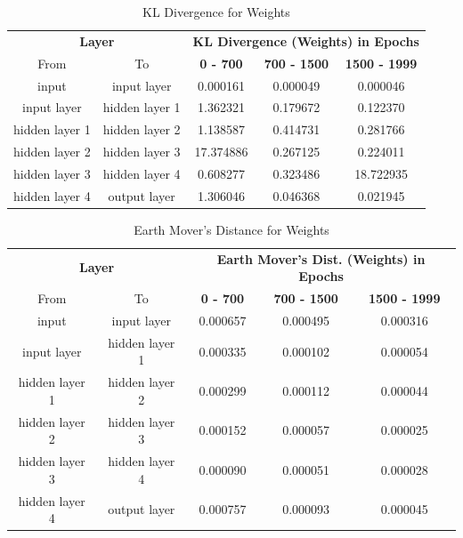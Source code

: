 \documentclass{ioereport}
\begin{document}
    \begin{table}[H]
    \caption{KL Divergence for Weights}
    \centering
    \begin{tabular}{|c|c|c|c|c|}
    \hline
    \multicolumn{2}{|c|}{\textbf{Layer}} & \multicolumn{3}{c|}{\textbf{KL Divergence (Weights) in Epochs}} \\
    \cline{1-5}
    From & To & \textbf{0 - 700} & \textbf{700 - 1500} & \textbf{1500 - 1999} \\
    \hline
    input & input layer & 0.000161 & 0.000049 & 0.000046 \\
    input layer & hidden layer 1 & 1.362321 & 0.179672 & 0.122370 \\
    hidden layer 1 & hidden layer 2 & 1.138587 & 0.414731 & 0.281766 \\
    hidden layer 2 & hidden layer 3 & 17.374886 & 0.267125 & 0.224011 \\
    hidden layer 3 & hidden layer 4 & 0.608277 & 0.323486 & 18.722935 \\
    hidden layer 4 & output layer & 1.306046 & 0.046368 & 0.021945 \\
    \hline
    \end{tabular}
    \end{table}

    \begin{table}[H]
    \caption{Earth Mover's Distance for Weights}
    \centering
    \begin{tabular}{|c|c|c|c|c|}
    \hline
    \multicolumn{2}{|c|}{\textbf{Layer}} & \multicolumn{3}{c|}{\textbf{Earth Mover's Dist. (Weights) in Epochs}} \\
    \cline{1-5}
    From & To & \textbf{0 - 700} & \textbf{700 - 1500} & \textbf{1500 - 1999} \\
    \hline
    input & input layer & 0.000657 & 0.000495 & 0.000316 \\
    input layer & hidden layer 1 & 0.000335 & 0.000102 & 0.000054 \\
    hidden layer 1 & hidden layer 2 & 0.000299 & 0.000112 & 0.000044 \\
    hidden layer 2 & hidden layer 3 & 0.000152 & 0.000057 & 0.000025 \\
    hidden layer 3 & hidden layer 4 & 0.000090 & 0.000051 & 0.000028 \\
    hidden layer 4 & output layer & 0.000757 & 0.000093 & 0.000045 \\
    \hline
    \end{tabular}
    \end{table}
\end{document}
